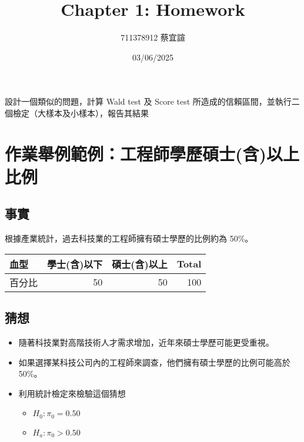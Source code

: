 \documentclass[
]{article}
\title{Chapter 1: Homework}
\author{711378912 蔡宜諠}
\date{03/06/2025}
\providecommand{\tightlist}{%
  \setlength{\itemsep}{0pt}\setlength{\parskip}{0pt}}
\begin{document}
\maketitle

設計一個類似的問題，計算 Wald test 及 Score test
所造成的信賴區間，並執行二個檢定（大樣本及小樣本），報告其結果

\hypertarget{ux4f5cux696dux8209ux4f8bux7bc4ux4f8bux5de5ux7a0bux5e2bux5b78ux6b77ux78a9ux58ebux542bux4ee5ux4e0aux6bd4ux4f8b}{%
\section{作業舉例範例：工程師學歷碩士(含)以上比例}\label{ux4f5cux696dux8209ux4f8bux7bc4ux4f8bux5de5ux7a0bux5e2bux5b78ux6b77ux78a9ux58ebux542bux4ee5ux4e0aux6bd4ux4f8b}}

\hypertarget{ux4e8bux5be6}{%
\subsection{事實}\label{ux4e8bux5be6}}

根據產業統計，過去科技業的工程師擁有碩士學歷的比例約為 50\%。

\begin{longtable}[]{@{}lrrr@{}}
\toprule\noalign{}
血型 & 學士(含)以下 & 碩士(含)以上 & Total \\
\midrule\noalign{}
\endhead
\bottomrule\noalign{}
\endlastfoot
百分比 & 50 & 50 & 100 \\
\end{longtable}

\hypertarget{ux731cux60f3}{%
\subsection{猜想}\label{ux731cux60f3}}

\begin{itemize}
\item
  隨著科技業對高階技術人才需求增加，近年來碩士學歷可能更受重視。
\item
  如果選擇某科技公司內的工程師來調查，他們擁有碩士學歷的比例可能高於50\%。
\item
  利用統計檢定來檢驗這個猜想

  \begin{itemize}
  \tightlist
  \item
    \(H_0: \pi_0=0.50\)
  \item
    \(H_a: \pi_0>0.50\)
  \end{itemize}
\end{itemize}
\end{document}
